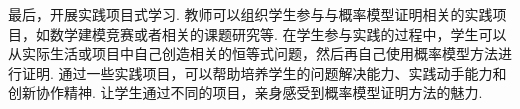 最后，开展实践项目式学习. 教师可以组织学生参与与概率模型证明相关的实践项目，如数学建模竞赛或者相关的课题研究等. 在学生参与实践的过程中，学生可以从实际生活或项目中自己创造相关的恒等式问题，然后再自己使用概率模型方法进行证明. 通过一些实践项目，可以帮助培养学生的问题解决能力、实践动手能力和创新协作精神. 让学生通过不同的项目，亲身感受到概率模型证明方法的魅力. 
